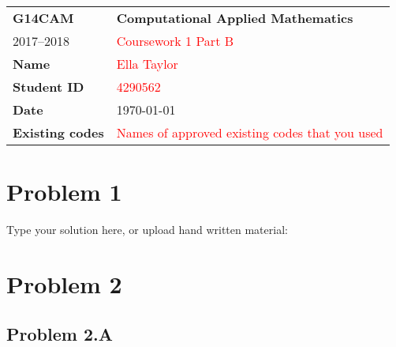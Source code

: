 \documentclass[a4paper,12pt,onecolumn,final]{article}
\begin{document}


\noindent
\begin{tabular}{|p{}|p{}|}
\hline
\textbf{G14CAM} & \textbf{Computational Applied Mathematics}
\\
2017--2018 & \textcolor{red}{Coursework 1 Part B}
\\
\hline
\textbf{Name} & \textcolor{red}{Ella Taylor}
\\ 
\textbf{Student ID} & \textcolor{red}{4290562}
\\ 
\textbf{Date} & \today
\\
\hline
\textbf{Existing codes} & \textcolor{red}{Names of approved existing codes that you used}
\\
\hline
\end{tabular}
\section*{Problem 1}
Type your solution here, or upload hand written material:


\section*{Problem 2}
\subsection*{Problem 2.A}
\end{document}
